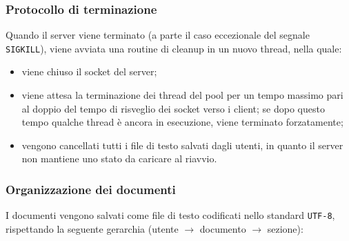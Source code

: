 \subsubsection{Protocollo di terminazione}
\sloppy
Quando il server viene terminato (a parte il caso eccezionale del segnale \texttt{SIGKILL}), viene avviata una routine di cleanup in un nuovo thread, nella quale:
\begin{itemize}
	\item viene chiuso il socket del server;
	\item viene attesa la terminazione dei thread del pool per un tempo massimo pari al doppio del tempo di risveglio dei socket verso i client; se dopo questo tempo qualche thread è ancora in esecuzione, viene terminato forzatamente;
	\item vengono cancellati tutti i file di testo salvati dagli utenti, in quanto il server non mantiene uno stato da caricare al riavvio.
\end{itemize}

\subsubsection{Organizzazione dei documenti}
I documenti vengono salvati come file di testo codificati nello standard \texttt{UTF-8}, rispettando la seguente gerarchia (utente $\rightarrow$ documento $\rightarrow$ sezione):

\medskip

